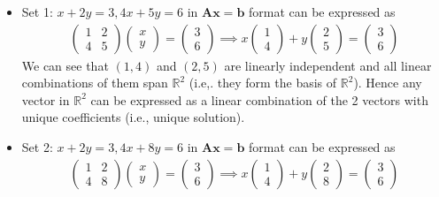 \documentclass[12pt, letterpaper]{article}
\begin{document}
\begin{itemize}
\item Set 1: $x + 2y = 3, 4x + 5y = 6$ in $\mathbf{Ax} = \mathbf{b}$ format can be expressed as
\[\begin{split}
  \begin{pmatrix}1&2\\4&5\end{pmatrix} \begin{pmatrix}x\\y\end{pmatrix}
  = \begin{pmatrix}3\\6\end{pmatrix}
  \implies x\begin{pmatrix}1\\4\end{pmatrix} + y \begin{pmatrix}2\\5\end{pmatrix}
  = \begin{pmatrix}3\\6\end{pmatrix}
\end{split}\]
We can see that $(1,4)$ and $(2,5)$ are linearly independent and all linear combinations of them span $\mathbb{R}^2$ (i.e,. they form the basis of $\mathbb{R}^2$). Hence any vector in $\mathbb{R}^2$ can be expressed as a linear combination of the 2 vectors with unique coefficients (i.e., unique solution).
\item Set 2: $x + 2y = 3, 4x + 8y = 6$ in $\mathbf{Ax} = \mathbf{b}$ format can be expressed as
\[\begin{split}
  \begin{pmatrix}1&2\\4&8\end{pmatrix} \begin{pmatrix}x\\y\end{pmatrix}
  = \begin{pmatrix}3\\6\end{pmatrix}
  \implies x\begin{pmatrix}1\\4\end{pmatrix} + y \begin{pmatrix}2\\8\end{pmatrix}
  = \begin{pmatrix}3\\6\end{pmatrix}

\end{split}\]
\end{itemize}
\end{document}
